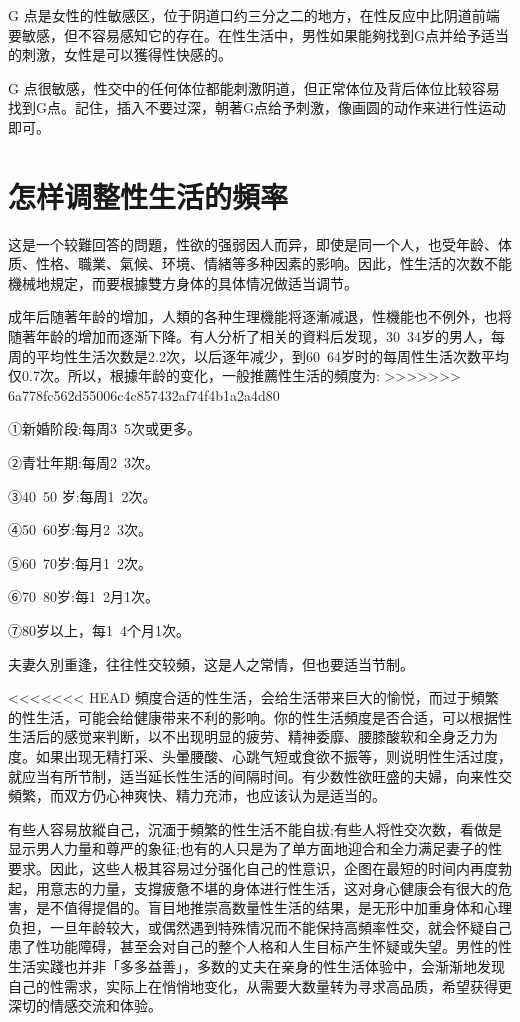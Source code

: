 \documentclass[12pt,UTF8]{ctexbook}
\begin{document}
G 点是女性的性敏感区，位于阴道口约三分之二的地方，在性反应中比阴道前端要敏感，但不容易感知它的存在。在性生活中，男性如果能夠找到G点并给予适当的刺激，女性是可以獲得性快感的。

G 点很敏感，性交中的任何体位都能刺激阴道，但正常体位及背后体位比较容易找到G点。記住，插入不要过深，朝著G点给予刺激，像画圆的动作来进行性运动即可。

\section{怎样调整性生活的頻率}

这是一个较難回答的問題，性欲的强弱因人而异，即使是同一个人，也受年龄、体质、性格、職業、氣候、环境、情緒等多种因素的影响。因此，性生活的次数不能機械地規定，而要根據雙方身体的具体情况做适当调节。

成年后随著年龄的增加，人類的各种生理機能将逐漸减退，性機能也不例外，也将随著年龄的增加而逐渐下降。有人分析了相关的資料后发现，30~34岁的男人，每周的平均性生活次数是2.2次，以后逐年减少，到60~64岁时的每周性生活次数平均仅0.7次。所以，根據年龄的变化，一般推薦性生活的頻度为:
>>>>>>> 6a778fc562d55006c4c857432af74f4b1a2a4d80

①新婚阶段:每周3~5次或更多。

②青壮年期:每周2~3次。

③40~50 岁:每周1~2次。

④50~60岁:每月2~3次。

⑤60~70岁:每月1~2次。

⑥70~80岁:每1~2月1次。

⑦80岁以上，每1~4个月1次。

夫妻久別重逢，往往性交较頻，这是人之常情，但也要适当节制。

<<<<<<< HEAD
頻度合适的性生活，会给生活带来巨大的愉悦，而过于頻繁的性生活，可能会给健康带来不利的影响。你的性生活頻度是否合适，可以根据性生活后的感觉来判断，以不出现明显的疲劳、精神委靡、腰膝酸软和全身乏力为度。如果出现无精打采、头暈腰酸、心跳气短或食欲不振等，则说明性生活过度，就应当有所节制，适当延长性生活的间隔时间。有少数性欲旺盛的夫婦，向来性交頻繁，而双方仍心神爽快、精力充沛，也应该认为是适当的。

有些人容易放縱自己，沉湎于頻繁的性生活不能自拔;有些人将性交次数，看做是显示男人力量和尊严的象征;也有的人只是为了单方面地迎合和全力满足妻子的性要求。因此，这些人极其容易过分强化自己的性意识，企图在最短的时间内再度勃起，用意志的力量，支撐疲惫不堪的身体进行性生活，这对身心健康会有很大的危害，是不值得提倡的。盲目地推崇高数量性生活的结果，是无形中加重身体和心理负担，一旦年龄较大，或偶然遇到特殊情况而不能保持高頻率性交，就会怀疑自己患了性功能障碍，甚至会对自己的整个人格和人生目标产生怀疑或失望。男性的性生活实踐也并非「多多益善」，多数的丈夫在亲身的性生活体验中，会渐渐地发现自己的性需求，实际上在悄悄地变化，从需要大数量转为寻求高品质，希望获得更深切的情感交流和体验。
\end{document}
